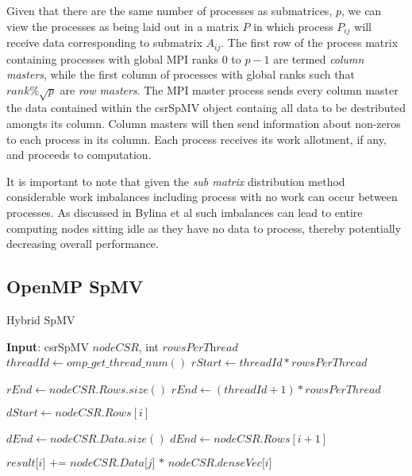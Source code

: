 Given that there are the same number of processes as submatrices, $p$, we can view the processes as being laid out in a matrix $P$ in which process $P_{ij}$ will receive data corresponding to submatrix $A_{ij}$.
The first row of the process matrix containing processes with global MPI ranks $0$ to $p-1$ are termed \emph{column masters}, while the first column of processes with global ranks such that $rank \% \sqrt{p} $ are \emph{row masters}.
The MPI master process sends every column master the data contained within the csrSpMV object containg all data to be destributed amongts its column.
Column masters will then send information about non-zeros to each process in its column.
Each process receives its work allotment, if any, and proceeds to computation.

It is important to note that given the \emph{sub matrix} distribution method considerable work imbalances including process with no work can occur between processes. As discussed in Bylina et al such imbalances can lead to entire computing nodes sitting idle as they have no data to process, thereby potentially decreasing overall performance. 

\subsection{OpenMP SpMV}
\begin{algorithm}
\caption{Hybrid SpMV}\label{euclid}
\begin{algorithmic}[1]
	\State \textbf{Input}: csrSpMV $\textit{nodeCSR}$, int $\textit{rowsPerThread}$
	\medskip
	\State $threadId \gets omp\_get\_thread\_num()$
	\State $rStart \gets threadId*rowsPerThread$
	\medskip
	
		\State $rEnd \gets nodeCSR.Rows.size()$
	\Else 
		\State $rEnd \gets (threadId+1) * rowsPerThread$
	\EndIf
	\medskip
	
		\State $dStart \gets nodeCSR.Rows[i]$
		
			\State $dEnd \gets nodeCSR.Data.size()$
		\Else 
			\State $dEnd \gets nodeCSR.Rows[i+1]$
		\EndIf
			
			\State $\textit{result[i] += nodeCSR.Data[j] * nodeCSR.denseVec[i]}$
		\EndFor
	\EndFor
	
	\EndProcedure
\end{algorithmic}
\end{algorithm}

